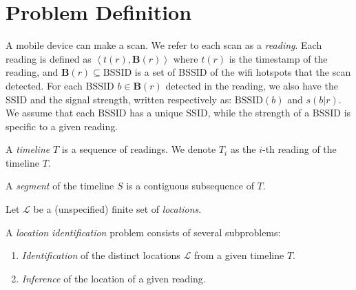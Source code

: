 \newcommand{\bssid}{\mathbf{B}}
\newcommand{\ssid}{\mathrm{BSSID}}

\section{Problem Definition}

A mobile device can make a scan.  We refer to each scan as a {\em reading}.
Each reading is defined as $\left<t(r), \bssid(r)\right>$ where $t(r)$ is
the timestamp of the reading, and $\bssid(r)\subseteq\mathrm{BSSID}$ is a set of
BSSID of the wifi hotspots that the scan detected. For each BSSID $b\in
\bssid(r)$ detected in the reading, we also have the SSID and the signal
strength, written respectively as:
$\ssid(b)$ and $s(b|r)$.  We assume that each BSSID has a unique SSID, while the
strength of a BSSID is specific to a given reading.

\begin{definition}
    A {\em timeline} $T$ is a sequence of readings.  
    We denote $T_i$ as the $i$-th reading of the timeline $T$.

    A {\em segment} of the timeline $S$ is a contiguous subsequence of $T$.
\end{definition}

Let $\mathcal{L}$ be a (unspecified) finite set of {\em locations}.

\begin{definition}
    A {\em location identification} problem consists of several subproblems:

    \begin{enumerate}
        \item {\em Identification} of the distinct locations $\mathcal{L}$ from
            a given timeline $T$.
        \item {\em Inference} of the location of a given reading.
    \end{enumerate}
\end{definition}
